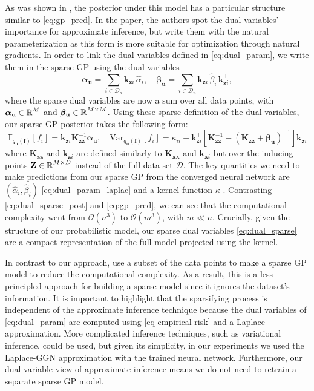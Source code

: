 \documentclass{article}
\newcommand{\dataset}{\ensuremath{\mathcal{D}}}
\newcommand{\mathbold}[1]{\bm{#1}}
\newcommand{\mbf}[1]{\mathbf{#1}}
\newcommand{\MZ}{\mbf{Z}}
\newcommand{\T}{\top}
\newcommand{\valpha}[0]{\mathbold{\alpha}}
\newcommand{\vbeta}[0]{\mathbold{\beta}}
\newcommand{\vf}{\mbf{f}}
\newcommand{\vu}{\mbf{u}}
\newcommand{\vx}{\mbf{x}}
\newcommand{\MKzz}{\mbf{K}_{\mbf{z}\mbf{z}}}
\newcommand{\MKxx}{\mbf{K}_{\mbf{x}\mbf{x}}}
\newcommand{\vkzi}{\mbf{k}_{\mbf{z}i}}
\newcommand{\vkzs}{\mbf{k}_{\mbf{z}i}}
\newcommand{\vk}{\mbf{k}}
\newcommand{\myexpect}{\mathbb{E}}
\begin{document}
As was shown in \cite{adam2021dual}, the posterior under this model has a particular structure similar to \cref{eq:gp_pred}. In the paper, the authors spot the dual variables' importance for approximate inference, but write them with the natural parameterization as this form is more suitable for optimization through natural gradients. In order to link the dual variables defined in \cref{eq:dual_param}, we write them in the sparse GP using the dual variables
\begin{equation} 
	\valpha_{\vu}  =  \sum_{i \in \mathcal{D}_{n}}  \vkzi \, \hat{\alpha}_{i}, \quad
	\vbeta_{\vu} =  \sum_{i \in \mathcal{D}_{n}} \vkzi \,\hat{\beta}_{i} \, \vkzi^{\T} ,    
\label{eq:dual_sparse}
\end{equation}
where the sparse dual variables are now a sum over all data points, with $\valpha_{\vu} \in \R^{M}$ and $\vbeta_{\vu} \in \R^{M  \times M}$. Using these sparse definition of the dual variables, our sparse GP posterior takes the following form:
\begin{equation}\label{eq:dual_sparse_post}
   \myexpect_{q_{\vu}(\vf)}[f_i] = \vkzs^{\T} \MKzz^{-1}   \valpha_{\vu} , \quad 
   \textrm{Var}_{q_{\vu}(\vf)}[f_i]  = \kappa_{ii} - \vkzs^\top [\MKzz^{-1} - (\MKzz + \vbeta_{\vu})^{-1} ]\vkzs
\end{equation}
where $\MKzz$ and $\vkzs$ are defined similarly to $\MKxx$ and $\vk_{\vx i}$ but over the inducing points $\MZ \in \R^{M \times D} $  instead of the full data set $\dataset$. The key quantities we need to make predictions from our sparse GP from the converged neural network are $(\hat{\alpha}_i, \hat{\beta}_i)$ \cref{eq:dual_param_laplac} and a kernel function $\kappa$ . Contrasting \cref{eq:dual_sparse_post} and \cref{eq:gp_pred}, we can see that the computational complexity went from $\mathcal{O}(n^3)$ to $\mathcal{O}(m^3)$, with $m \ll n$.  Crucially, given the structure of our probabilistic model, our sparse dual variables \cref{eq:dual_sparse} are a compact representation of the full model projected using the kernel. 

In contrast to our approach, \citet{immer2021improving} use a subset of the data points to make a sparse GP model to reduce the computational complexity. As a result, this is a less principled approach for building a sparse model since it ignores the dataset's information. It is important to highlight that the sparsifying process is independent of the approximate inference technique because the dual variables of \cref{eq:dual_param} are computed using \cref{eq-empirical-risk} and a Laplace approximation.
More complicated inference techniques, such as variational inference, could be used, but given its simplicity, in our experiments we used the Laplace-GGN approximation with the trained neural network. Furthermore, our dual variable view of approximate inference means we do not need to retrain a separate sparse GP model. 
\end{document}
